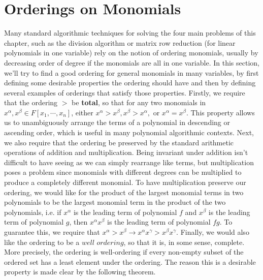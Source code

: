 \documentclass{article}
\begin{document}
\section{Orderings on Monomials}
Many standard algorithmic techniques for solving the four main problems of this chapter, such as the division algorithm or matrix row reduction (for linear polynomials in one variable) rely on the notion of ordering monomials, usually by decreasing order of degree if the monomials are all in one variable. In this section, we'll try to find a good ordering for general monomials in many variables, by first defining some desirable properties the ordering should have and then by defining several examples of orderings that satisfy those properties.
\newline \newline
Firstly, we require that the ordering $ > $ be \textbf{total}, so that for any two monomials in $ x^\alpha, x^\beta \in F[x_1, \cdots, x_n] $, either $ x^\alpha > x^\beta, x^\beta > x^\alpha, $ or $ x^\alpha = x^\beta $. This property allows us to unambiguously arrange the terms of a polynomial in descending or ascending order, which is useful in many polynomial algorithmic contexts. 
\newline
Next, we also require that the ordering be preserved by the standard arithmetic operations of addition and multiplication. Being invariant under addition isn't difficult to have seeing as we can simply rearrange like terms, but multiplication poses a problem since monomials with different degrees can be multiplied to produce a completely different monomial. To have multiplication preserve our ordering, we would like for the product of the largest monomial terms in two polynomials to be the largest monomial term in the product of the two polynomials, i.e. if $ x^\alpha $ is the leading term of polynomial $ f $ and $ x^\beta $ is the leading term of polynomial $ g $, then $ x^\alpha x^\beta $ is the leading term of polynomial $ f g $. To guarantee this, we require that $ x^\alpha > x^\beta \rightarrow x^\alpha x^\gamma > x^\beta x^\gamma $.
\newline
Finally, we would also like the ordering to be a $ \textit{well ordering} $, so that it is, in some sense, complete. More precisely, the ordering is well-ordering if every non-empty subset of the ordered set has a least element under the ordering. The reason this is a desirable property is made clear by the following theorem.
\newline \newline
\end{document}
